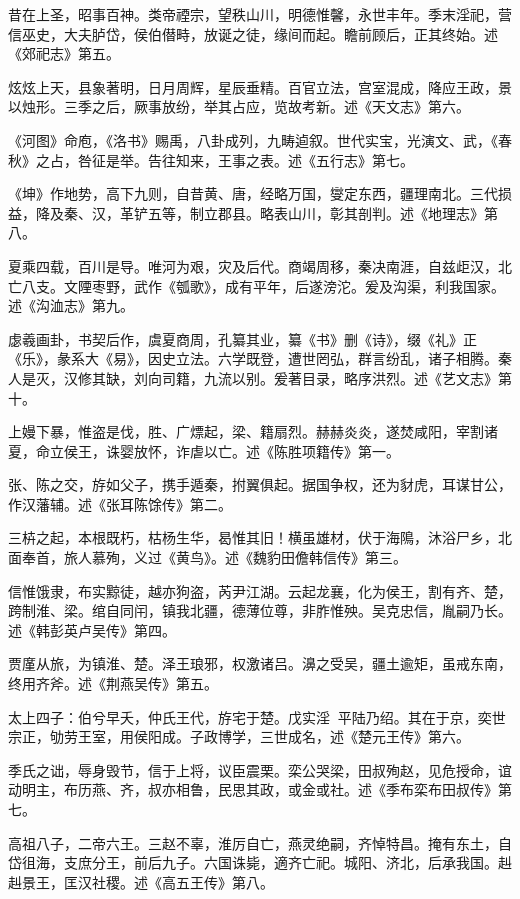 \documentclass[]{article}
\begin{document}
昔在上圣，昭事百神。类帝禋宗，望秩山川，明德惟馨，永世丰年。季末淫祀，营信巫史，大夫胪岱，侯伯僣畤，放诞之徒，缘间而起。瞻前顾后，正其终始。述《郊祀志》第五。

炫炫上天，县象著明，日月周辉，星辰垂精。百官立法，宫室混成，降应王政，景以烛形。三季之后，厥事放纷，举其占应，览故考新。述《天文志》第六。

《河图》命庖，《洛书》赐禹，八卦成列，九畴逌叙。世代实宝，光演文、武，《春秋》之占，咎征是举。告往知来，王事之表。述《五行志》第七。

《坤》作地势，高下九则，自昔黄、唐，经略万国，燮定东西，疆理南北。三代损益，降及秦、汉，革铲五等，制立郡县。略表山川，彰其剖判。述《地理志》第八。

夏乘四载，百川是导。唯河为艰，灾及后代。商竭周移，秦决南涯，自兹歫汉，北亡八支。文陻枣野，武作《瓠歌》，成有平年，后遂滂沱。爰及沟渠，利我国家。述《沟洫志》第九。

虙羲画卦，书契后作，虞夏商周，孔纂其业，纂《书》删《诗》，缀《礼》正《乐》，彖系大《易》，因史立法。六学既登，遭世罔弘，群言纷乱，诸子相腾。秦人是灭，汉修其缺，刘向司籍，九流以别。爰著目录，略序洪烈。述《艺文志》第十。

上嫚下暴，惟盗是伐，胜、广熛起，梁、籍扇烈。赫赫炎炎，遂焚咸阳，宰割诸夏，命立侯王，诛婴放怀，诈虐以亡。述《陈胜项籍传》第一。

张、陈之交，斿如父子，携手遁秦，拊翼俱起。据国争权，还为豺虎，耳谋甘公，作汉藩辅。述《张耳陈馀传》第二。

三枿之起，本根既朽，枯杨生华，曷惟其旧！横虽雄材，伏于海隝，沐浴尸乡，北面奉首，旅人慕殉，义过《黄鸟》。述《魏豹田儋韩信传》第三。

信惟饿隶，布实黥徒，越亦狗盗，芮尹江湖。云起龙襄，化为侯王，割有齐、楚，跨制淮、梁。绾自同闬，镇我北疆，德薄位尊，非胙惟殃。吴克忠信，胤嗣乃长。述《韩彭英卢吴传》第四。

贾廑从旅，为镇淮、楚。泽王琅邪，权激诸吕。濞之受吴，疆土逾矩，虽戒东南，终用齐斧。述《荆燕吴传》第五。

太上四子：伯兮早夭，仲氏王代，斿宅于楚。戊实淫，平陆乃绍。其在于京，奕世宗正，劬劳王室，用侯阳成。子政博学，三世成名，述《楚元王传》第六。

季氏之诎，辱身毁节，信于上将，议臣震栗。栾公哭梁，田叔殉赵，见危授命，谊动明主，布历燕、齐，叔亦相鲁，民思其政，或金或社。述《季布栾布田叔传》第七。

高祖八子，二帝六王。三赵不辜，淮厉自亡，燕灵绝嗣，齐悼特昌。掩有东土，自岱徂海，支庶分王，前后九子。六国诛毙，適齐亡祀。城阳、济北，后承我国。赳赳景王，匡汉社稷。述《高五王传》第八。
\end{document}
